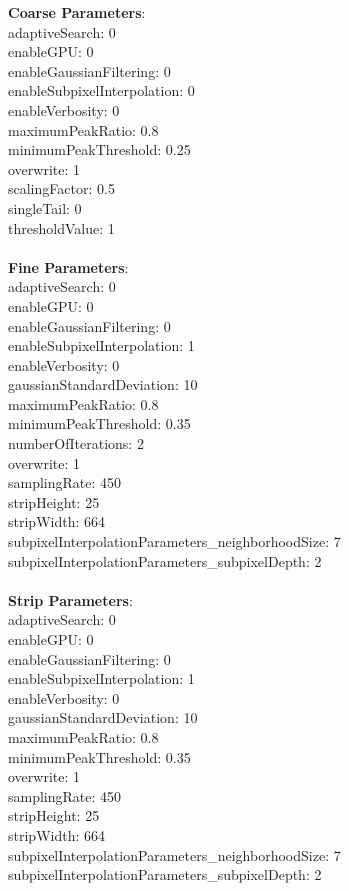 \documentclass[11pt]{article}
\begin{document}
\textbf{Coarse Parameters}: \\
adaptiveSearch: 0\\
enableGPU: 0\\
enableGaussianFiltering: 0\\
enableSubpixelInterpolation: 0\\
enableVerbosity: 0\\
maximumPeakRatio: 0.8\\
minimumPeakThreshold: 0.25\\
overwrite: 1\\
scalingFactor: 0.5\\
singleTail: 0\\
thresholdValue: 1\\
\\
\textbf{Fine Parameters}: \\
adaptiveSearch: 0\\
enableGPU: 0\\
enableGaussianFiltering: 0\\
enableSubpixelInterpolation: 1\\
enableVerbosity: 0\\
gaussianStandardDeviation: 10\\
maximumPeakRatio: 0.8\\
minimumPeakThreshold: 0.35\\
numberOfIterations: 2\\
overwrite: 1\\
samplingRate: 450\\
stripHeight: 25\\
stripWidth: 664\\
subpixelInterpolationParameters\_neighborhoodSize: 7\\
subpixelInterpolationParameters\_subpixelDepth: 2\\
\\
\textbf{Strip Parameters}: \\
adaptiveSearch: 0\\
enableGPU: 0\\
enableGaussianFiltering: 0\\
enableSubpixelInterpolation: 1\\
enableVerbosity: 0\\
gaussianStandardDeviation: 10\\
maximumPeakRatio: 0.8\\
minimumPeakThreshold: 0.35\\
overwrite: 1\\
samplingRate: 450\\
stripHeight: 25\\
stripWidth: 664\\
subpixelInterpolationParameters\_neighborhoodSize: 7\\
subpixelInterpolationParameters\_subpixelDepth: 2\\
\\
\newpage
\end{document}
